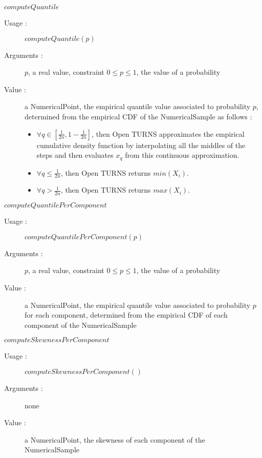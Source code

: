 \begin{description}
\begin{description}
  \item $computeQuantile$
    \begin{description}
    \item[Usage :] $computeQuantile(p)$
    \item[Arguments :] $p$, a real value, constraint $0\leq p \leq 1$, the value of a probability
    \item[Value :] a NumericalPoint, the empirical quantile value associated to probability $p$, determined from the empirical CDF of the NumericalSample as follows : \begin{itemize}
   \item $\forall q \in [\frac{1}{2n}, 1-\frac{1}{2n}]$, then Open TURNS approximates the empirical  cumulative density function by interpolating all the middles of the steps and then evaluates  $x_q$ from this continuous approximation. 
   \item $\forall q \leq \frac{1}{2n}$, then Open TURNS returns $min(X_i)$.
   \item $\forall q > \frac{1}{2n}$, then Open TURNS returns $max(X_i)$.
\end{itemize}
 
    \end{description}
    \bigskip

  \item $computeQuantilePerComponent$
    \begin{description}
    \item[Usage :] $computeQuantilePerComponent(p)$
    \item[Arguments :] $p$, a real value, constraint $0\leq p \leq 1$, the value of a probability
    \item[Value :] a NumericalPoint,
      the empirical quantile value associated to probability $p$ for each component, determined from the empirical CDF of each component of the NumericalSample
    \end{description}
    \bigskip

  \item $computeSkewnessPerComponent$
    \begin{description}
    \item[Usage :] $computeSkewnessPerComponent()$
    \item[Arguments :] none
    \item[Value :] a NumericalPoint,  the skewness of each component of the NumericalSample
    \end{description}
    \bigskip


\end{description}
\end{description}
